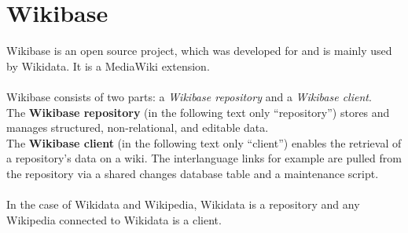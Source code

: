 \section{Wikibase}
Wikibase is an open source project, which was developed for and is mainly used by Wikidata. It is a MediaWiki extension. \\
\\
Wikibase consists of two parts: a \textit{Wikibase repository} and a \textit{Wikibase client}. \\
The \textbf{Wikibase repository} (in the following text only ``repository'')  stores and manages structured, non-relational, and editable data. \citep{wikibase:01} \\
The \textbf{Wikibase client} (in the following text only ``client'') enables the retrieval of a repository's data on a wiki. \citep{wikibase:01} The interlanguage links for example are pulled from the repository via a shared changes database table and a maintenance script. \citep{wiki:18} \\
\\
In the case of Wikidata and Wikipedia, Wikidata is a repository and any Wikipedia connected to Wikidata is a client.